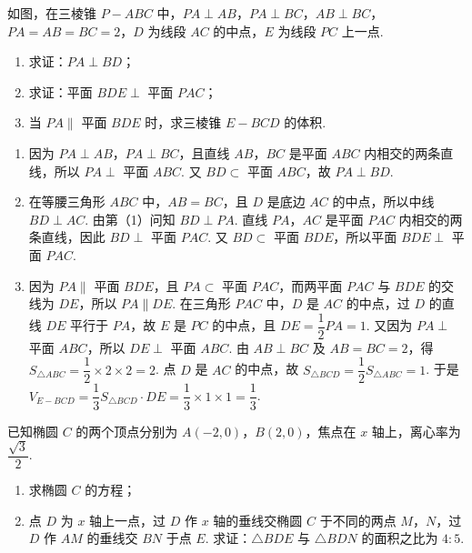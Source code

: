 \begin{problem}

如图，在三棱锥 \(P-ABC\) 中，\(PA\perp AB\)，\(PA\perp BC\)，\(AB\perp BC\)，\(PA=AB=BC=2\)，\(D\) 为线段 \(AC\) 的中点，\(E\) 为线段 \(PC\) 上一点.

\begin{enumerate}
\item 求证：\(PA\perp BD\)；
\item 求证：平面 \(BDE\perp\) 平面 \(PAC\)；
\item 当 \(PA\parallel\) 平面 \(BDE\) 时，求三棱锥 \(E-BCD\) 的体积.
\end{enumerate}

\FloatBarrier
\end{problem}

\begin{solution}
\begin{enumerate}
\item 因为 \(PA\perp AB\)，\(PA\perp BC\)，且直线 \(AB\)，\(BC\) 是平面 \(ABC\) 内相交的两条直线，所以 \(PA\perp\) 平面 \(ABC\). 又 \(BD\subset\) 平面 \(ABC\)，故 \(PA\perp BD\).
\item 在等腰三角形 \(ABC\) 中，\(AB=BC\)，且 \(D\) 是底边 \(AC\) 的中点，所以中线 \(BD\perp AC\). 由第（1）问知 \(BD\perp PA\). 直线 \(PA\)，\(AC\) 是平面 \(PAC\) 内相交的两条直线，因此 \(BD\perp\) 平面 \(PAC\). 又 \(BD\subset\) 平面 \(BDE\)，所以平面 \(BDE\perp\) 平面 \(PAC\).
\item 因为 \(PA\parallel\) 平面 \(BDE\)，且 \(PA\subset\) 平面 \(PAC\)，而两平面 \(PAC\) 与 \(BDE\) 的交线为 \(DE\)，所以 \(PA\parallel DE\). 在三角形 \(PAC\) 中，\(D\) 是 \(AC\) 的中点，过 \(D\) 的直线 \(DE\) 平行于 \(PA\)，故 \(E\) 是 \(PC\) 的中点，且 \(DE=\dfrac12PA=1\).
又因为 \(PA\perp\) 平面 \(ABC\)，所以 \(DE\perp\) 平面 \(ABC\). 由 \(AB\perp BC\) 及 \(AB=BC=2\)，得 \(S_{\triangle ABC}=\dfrac12\times2\times2=2\). 点 \(D\) 是 \(AC\) 的中点，故 \(S_{\triangle BCD}=\dfrac12S_{\triangle ABC}=1\). 于是
\(V_{E-BCD}=\dfrac13S_{\triangle BCD}\cdot DE=\dfrac13\times1\times1=\dfrac13\).
\end{enumerate}
\end{solution}

\begin{problem}

已知椭圆 \(C\) 的两个顶点分别为 \(A(-2,0)\)，\(B(2,0)\)，焦点在 \(x\) 轴上，离心率为 \(\dfrac{\sqrt3}{2}\).

\begin{enumerate}
\item 求椭圆 \(C\) 的方程；
\item 点 \(D\) 为 \(x\) 轴上一点，过 \(D\) 作 \(x\) 轴的垂线交椭圆 \(C\) 于不同的两点 \(M\)，\(N\)，过 \(D\) 作 \(AM\) 的垂线交 \(BN\) 于点 \(E\). 求证：\(\triangle BDE\) 与 \(\triangle BDN\) 的面积之比为 \(4:5\).
\end{enumerate}
\end{problem}

